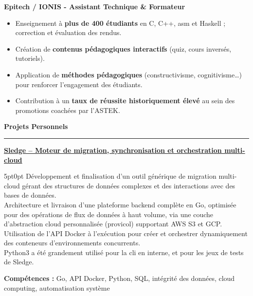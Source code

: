 \documentclass[9pt]{extarticle}
\begin{document}
{\bfseries Epitech / IONIS - Assistant Technique \& Formateur}
\begin{itemize}[noitemsep, topsep=0pt]
	\item Enseignement à {\bfseries plus de 400 étudiants} en C, C++, asm et Haskell ; correction et évaluation des rendus.
	\item Création de {\bfseries contenus pédagogiques interactifs} (quiz, cours inversés, tutoriels).
	\item Application de {\bfseries méthodes pédagogiques} (constructivisme, cognitivisme…) pour renforcer l'engagement des étudiants.
	\item Contribution à un {\bfseries taux de réussite historiquement élevé} au sein des promotions coachées par l'ASTEK.
\end{itemize}

\par\vspace{5pt}


{\large\bfseries Projets Personnels}
\par\vspace{-8pt}
\rule{\linewidth}{0.4pt}
\par\vspace{5pt}

\underline{\bfseries Sledge -- Moteur de migration, synchronisation et orchestration multi-cloud}
\par
\begin{adjustwidth}{5pt}{0pt}
    Développement et finalisation d'un outil générique de migration multi-cloud gérant des structures de données complexes et des interactions avec des bases de données. \\
    Architecture et livraison d'une plateforme backend complète en Go, optimisée pour des opérations de flux de données à haut volume, via une couche d'abstraction cloud personnalisée ({\ttfamily provicol}) supportant AWS S3 et GCP. \\
    Utilisation de l'API Docker à l'exécution pour créer et orchestrer dynamiquement des conteneurs d'environnements concurrents. \\
    Python3 a été grandement utilisé pour la cli en interne, et pour les jeux de tests de Sledge. \\
\end{adjustwidth}
\par
{\bfseries Compétences :} Go, API Docker, Python, SQL, intégrité des données, cloud computing, automatisation système
\end{document}
